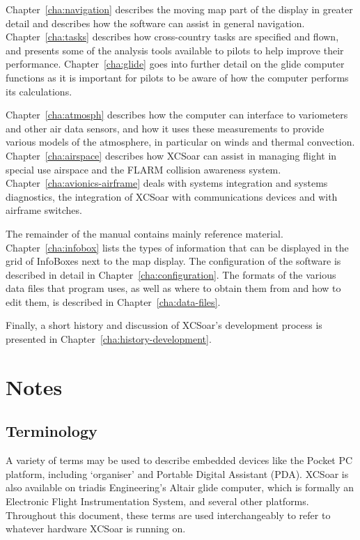 \documentclass[a4paper,12pt]{refrep}
\begin{document}
Chapter~\ref{cha:navigation} describes the moving map part of the
display in greater detail and describes how the software can assist in
general navigation.  Chapter~\ref{cha:tasks} describes how
cross-country tasks are specified and flown, and presents some of the
analysis tools available to pilots to help improve their performance.
Chapter~\ref{cha:glide} goes into further detail on the glide computer
functions as it is important for pilots to be aware of how the
computer performs its calculations.

Chapter~\ref{cha:atmosph} describes how the computer can interface to
variometers and other air data sensors, and how it uses these
measurements to provide various models of the atmosphere, in
particular on winds and thermal convection.
Chapter~\ref{cha:airspace} describes how XCSoar can assist in managing
flight in special use airspace and the FLARM collision awareness
system.  Chapter~\ref{cha:avionics-airframe} deals with systems
integration and systems diagnostics, the integration of XCSoar with
communications devices and with airframe switches.

The remainder of the manual contains mainly reference material.
Chapter~\ref{cha:infobox} lists the types of information that can be
displayed in the grid of InfoBoxes next to the map display.  The
configuration of the software is described in detail in
Chapter~\ref{cha:configuration}.  The formats of the various data
files that program uses, as well as where to obtain them from and how
to edit them, is described in Chapter~\ref{cha:data-files}.

Finally, a short history and discussion of XCSoar's development
process is presented in Chapter~\ref{cha:history-development}.

\section{Notes}

\subsection*{Terminology}
A variety of terms may be used to describe embedded devices like the Pocket PC
platform, including `organiser' and Portable Digital Assistant (PDA).  XCSoar is
also available on triadis Engineering's Altair glide computer, which is
formally an Electronic Flight Instrumentation System, and several other
platforms. Throughout this document, these terms are used interchangeably to
refer to whatever hardware XCSoar is running on.
\end{document}
